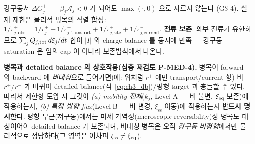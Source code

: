 강구동서 $\Delta G_j^{+\ddagger}-\beta_j\mathcal A_j<0$ 가 되어도 $\max(\cdot,0)$ 으로 자르지 않는다
(GS-4). 실제 제한은 물리적 병목의 직렬 합성:
$1/r_{j,\mathrm{obs}}^+=1/r_j^++1/r_{j,\mathrm{transport}}^++1/r_{j,\mathrm{site}}^++1/r_{j,\mathrm{current}}^+$.
\textbf{전류 보존}: 외부 전류가 유한하므로 $\sum_j Q_{j,\mathrm{tot}}\,d\xi_j/dt$ 합이 $|I|$ 와 charge
balance 를 동시에 만족 — 강구동 saturation 은 임의 cap 이 아니라 보존법칙에서 나온다.
\begin{boundbox}
\textbf{병목과 detailed balance 의 상호작용(심층 재검토 P-MED-4).} 병목이 forward 와 backward 에
\emph{비대칭}으로 들어가면(예: 위처럼 $r^+$ 에만 transport/current 항) 비 $r^+/r^-$ 가 바뀌어
detailed balance(식~\eqref{eq:ch3_db})/평형 target 과 충돌할 수 있다. 따라서 제한항 도입 시 그것이
\emph{(a) mobility 전체}($k_j$, Level A — 비 불변, $\xi_{\mathrm{eq}}$ 보존)에 작용하는지, \emph{(b) 특정 방향
flux}(Level B — 비 변경, $\xi_{\mathrm{ss}}$ 이동)에 작용하는지 \textbf{반드시 명시}한다. 평형 부근(저구동)에서는
미세 가역성(microscopic reversibility)상 병목도 대칭이어야 detailed balance 가 보존되며, 비대칭 병목은
오직 \emph{강구동 비평형}에서만 물리적으로 정당하다(그 영역은 어차피 $\xi_{\mathrm{ss}}\ne\xi_{\mathrm{eq}}$).
\end{boundbox}


